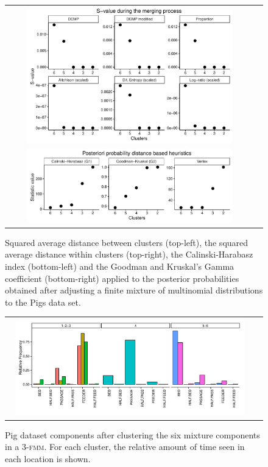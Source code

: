 \documentclass[submit]{smj}
\theoremstyle{definition}
\newcommand{\fmm}{\textsc{fmm}\xspace}
\begin{document}
\begin{figure}[th]
\begin{center}
\begin{tabular}{cc}
  \includegraphics[width=0.85\textwidth]{figures/multinomial_Svalues_all.pdf} \\
  \includegraphics[width=0.85\textwidth]{figures/multinomial_statistics.pdf} 
 \end{tabular}
 \caption{Squared average distance between clusters (top-left), the squared average distance within clusters (top-right), the Calinski-Harabasz index (bottom-left) and the Goodman and Kruskal's Gamma coefficient (bottom-right) applied to the posterior probabilities obtained after adjusting a finite mixture of multinomial distributions to the Pigs data set.}\label{multinomial_statistics}
\end{center}
\end{figure}

\begin{figure}[t]
\begin{center}
\begin{tabular}{cc}
  \includegraphics[width=0.95\textwidth]{figures/multinomial_clust3_all.pdf} \\
 \end{tabular}
 \caption{Pig dataset components after clustering the six mixture components in a 3-\fmm. For each cluster, the relative amount of time seen in each location is shown.}\label{multinomial_clust3}
\end{center}
\end{figure}
\end{document}
